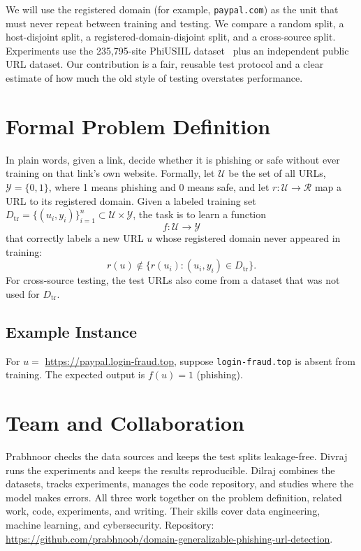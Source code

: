 \documentclass[sigconf,nonacm]{acmart}
\begin{document}
We will use the registered domain (for example, \texttt{paypal.com}) as the unit that must never repeat between training and testing. We compare a random split, a host-disjoint split, a registered-domain-disjoint split, and a cross-source split. Experiments use the 235,795-site PhiUSIIL dataset~\cite{prasad2024} plus an independent public URL dataset. Our contribution is a fair, reusable test protocol and a clear estimate of how much the old style of testing overstates performance.

\section{Formal Problem Definition}
In plain words, given a link, decide whether it is phishing or safe without ever training on that link's own website. Formally, let $\mathcal{U}$ be the set of all URLs, $\mathcal{Y}=\{0,1\}$, where 1 means phishing and 0 means safe, and let $r:\mathcal{U}\rightarrow\mathcal{R}$ map a URL to its registered domain. Given a labeled training set
$D_{\mathrm{tr}}=\{(u_i,y_i)\}_{i=1}^{n}\subset\mathcal{U}\times\mathcal{Y}$,
the task is to learn a function
\[
 f:\mathcal{U}\rightarrow\mathcal{Y}
\]
that correctly labels a new URL $u$ whose registered domain never appeared in training:
\[
 r(u)\notin\{r(u_i):(u_i,y_i)\in D_{\mathrm{tr}}\}.
\]
For cross-source testing, the test URLs also come from a dataset that was not used for $D_{\mathrm{tr}}$.

\subsection{Example Instance}
For $u=$ \url{https://paypal.login-fraud.top}, suppose \texttt{login-fraud.top} is absent from training. The expected output is $f(u)=1$ (phishing).

\section{Team and Collaboration}
Prabhnoor checks the data sources and keeps the test splits leakage-free. Divraj runs the experiments and keeps the results reproducible. Dilraj combines the datasets, tracks experiments, manages the code repository, and studies where the model makes errors. All three work together on the problem definition, related work, code, experiments, and writing. Their skills cover data engineering, machine learning, and cybersecurity. Repository: \url{https://github.com/prabhnoob/domain-generalizable-phishing-url-detection}.



\end{document}

